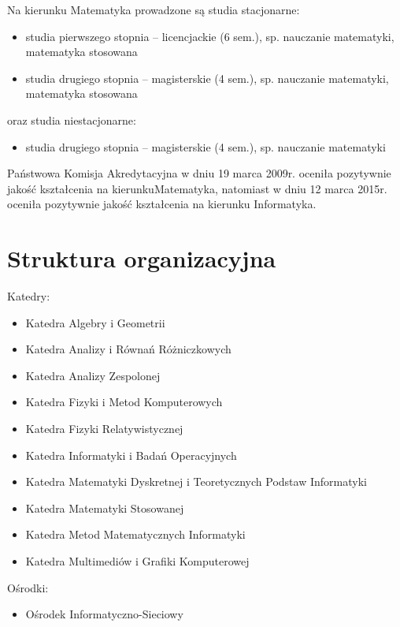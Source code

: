 ﻿\documentclass[a4paper,12pt]{article}
\begin{document}
Na kierunku Matematyka prowadzone są studia stacjonarne: 

\begin{itemize}
\item studia pierwszego stopnia – licencjackie (6 sem.), sp. nauczanie matematyki, matematyka stosowana
\item studia drugiego stopnia – magisterskie (4 sem.), sp. nauczanie matematyki, matematyka stosowana
\end{itemize}

oraz studia niestacjonarne:

\begin{itemize}
\item studia drugiego stopnia – magisterskie (4 sem.), sp. nauczanie matematyki
\end{itemize}

Państwowa Komisja Akredytacyjna w dniu 19 marca 2009r. oceniła pozytywnie jakość kształcenia na kierunkuMatematyka, natomiast w dniu 12 marca 2015r. oceniła pozytywnie jakość kształcenia na kierunku Informatyka. 

\section{Struktura organizacyjna}
Katedry:
\begin{itemize}
\item Katedra Algebry i Geometrii
\item Katedra Analizy i Równań Różniczkowych
\item Katedra Analizy Zespolonej 
\item Katedra Fizyki i Metod Komputerowych
\item Katedra Fizyki Relatywistycznej
\item Katedra Informatyki i Badań Operacyjnych
\item Katedra Matematyki Dyskretnej i Teoretycznych Podstaw Informatyki
\item Katedra Matematyki Stosowanej
\item Katedra Metod Matematycznych Informatyki
\item Katedra Multimediów i Grafiki Komputerowej
\end{itemize}
Ośrodki:
\begin{itemize}
\item Ośrodek Informatyczno-Sieciowy
\end{itemize}
\end{document}
